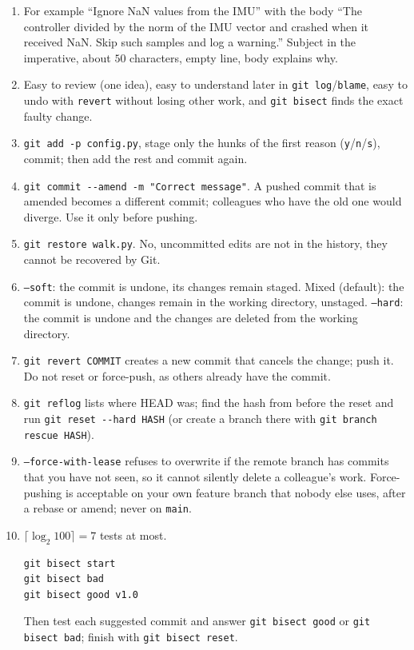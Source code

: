 \begin{enumerate}[label=\textbf{\ansnum.\arabic*}]
  \item For example ``Ignore NaN values from the IMU'' with the body ``The controller divided by the norm of the IMU vector and crashed when it received NaN. Skip such samples and log a warning.'' Subject in the imperative, about $50$ characters, empty line, body explains why.
  \item Easy to review (one idea), easy to understand later in \texttt{git log}/\texttt{blame}, easy to undo with \texttt{revert} without losing other work, and \texttt{git bisect} finds the exact faulty change.
  \item \verb!git add -p config.py!, stage only the hunks of the first reason (\texttt{y}/\texttt{n}/\texttt{s}), commit; then add the rest and commit again.
  \item \verb!git commit --amend -m "Correct message"!. A pushed commit that is amended becomes a different commit; colleagues who have the old one would diverge. Use it only before pushing.
  \item \verb!git restore walk.py!. No, uncommitted edits are not in the history, they cannot be recovered by Git.
  \item \texttt{--soft}: the commit is undone, its changes remain staged. Mixed (default): the commit is undone, changes remain in the working directory, unstaged. \texttt{--hard}: the commit is undone and the changes are deleted from the working directory.
  \item \verb!git revert COMMIT! creates a new commit that cancels the change; push it. Do not reset or force-push, as others already have the commit.
  \item \verb!git reflog! lists where HEAD was; find the hash from before the reset and run \verb!git reset --hard HASH! (or create a branch there with \verb!git branch rescue HASH!).
  \item \texttt{--force-with-lease} refuses to overwrite if the remote branch has commits that you have not seen, so it cannot silently delete a colleague's work. Force-pushing is acceptable on your own feature branch that nobody else uses, after a rebase or amend; never on \texttt{main}.
  \item[\textbf{\ansnum.10}] $\lceil\log_2 100\rceil=7$ tests at most.
\begin{verbatim}
git bisect start
git bisect bad
git bisect good v1.0
\end{verbatim}
  Then test each suggested commit and answer \texttt{git bisect good} or \texttt{git bisect bad}; finish with \texttt{git bisect reset}.
\end{enumerate}
